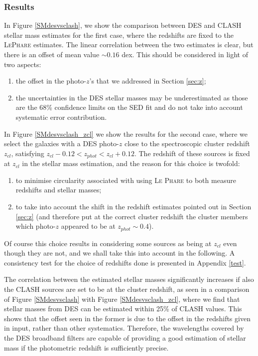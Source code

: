 {\subsubsection{Results}
 In Figure \ref{SMdesvsclash}, we show the comparison between DES and CLASH stellar mass estimates for the first case, where the redshifts are fixed to the \textsc{LePhare} estimates.
 The linear correlation between the two estimates is clear, but there is an offset of mean value $\sim 0.16$ dex. This should be considered in light of two aspects:
\begin{enumerate}
\item the offset in the photo-$z$'s that we addressed in Section \ref{sec:z};
\item the uncertainties in the DES stellar masses may be underestimated as those are the 68\% confidence limits on the SED fit and do not take into account systematic error contribution.
\end{enumerate}

In Figure \ref{SMdesvsclash_zcl} we show the results for the second case, where we select the galaxies with a DES photo-$z$ close to the spectroscopic cluster redshift $z_{cl}$, satisfying $z_{cl}-0.12<z_{phot}<z_{cl}+0.12$. The redshift of these sources is fixed at $z_{cl}$ in the stellar mass estimation, and the reason for this choice is twofold:
\begin{enumerate}
\item to minimise circularity associated with using \textsc{Le Phare} to both measure redshifts and stellar masses;
\item to take into account the shift in the redshift estimates pointed out in Section \ref{sec:z} (and therefore put at the correct cluster redshift the cluster members which photo-$z$ appeared to be at $z_{phot}\sim 0.4$).
\end{enumerate}

Of course this choice results in considering some sources as being at $z_{cl}$ even though they are not, and we shall take this into account in the following.  A consistency test for the choice of redshifts done is presented in Appendix \ref{test}.

The correlation between the estimated stellar masses significantly increases if also the CLASH sources are set to be at the cluster redshift, as seen in a comparison of Figure \ref{SMdesvsclash} with Figure \ref{SMdesvsclash_zcl}, where we find that stellar masses from DES can be estimated within 25\% of CLASH values. This shows that the offset seen in the former is due to the offset in the redshifts given in input, rather than other systematics. Therefore, the wavelengths covered by the DES broadband filters are capable of providing a good estimation of stellar mass if the photometric redshift is sufficiently precise. 

}
